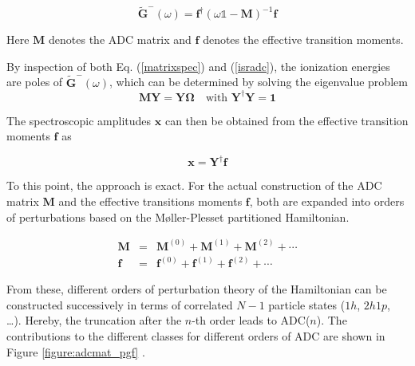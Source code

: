 \begin{equation}\label{isradc}
\mathbf{\tilde{G}}^-(\omega) = \mathbf{f}^\dagger(\omega\mathds{1}-\mathbf{M})^{-1}\mathbf{f}
\end{equation}

Here $\mathbf{M}$ denotes the {ADC} matrix and $\mathbf{f}$ denotes
the effective transition moments.

By inspection of both Eq. (\ref{matrixspec}) and (\ref{isradc}),
the ionization energies
are poles of $\mathbf{\tilde{G}}^-(\omega)$, which can be determined by
solving the eigenvalue problem
\begin{equation}\label{adcewp}
\mathbf{M} \mathbf{Y} = \mathbf{Y}\mathbf{\Omega} \quad\text{with } \mathbf{Y}^\dagger\mathbf{Y}=\mathbf{1}
\end{equation}

The spectroscopic amplitudes $\mathbf{x}$ can then be obtained from the
effective transition moments $\mathbf{f}$ as

\begin{equation}
 \mathbf{x} = \mathbf{Y}^\dagger \mathbf{f}
\end{equation}

To this point, the approach is exact.
For the actual construction of the {ADC} matrix $\mathbf{M}$ and the
effective transitions moments $\mathbf{f}$, both
are expanded into orders of perturbations based on the
M{\o}ller-Plesset partitioned Hamiltonian.

\begin{eqnarray}
\mathbf{M} &=& \mathbf{M}^{(0)} + \mathbf{M}^{(1)} + \mathbf{M}^{(2)} + \cdots\label{stf}\\
\mathbf{f} &=& \mathbf{f}^{(0)} + \mathbf{f}^{(1)} + \mathbf{f}^{(2)} + \cdots\label{stf}
\end{eqnarray}

From these, different orders of perturbation theory of the Hamiltonian can be
constructed successively in terms of correlated $N-1$ particle states ($1h$,
$2h1p$, \dots).
Hereby, the truncation after the $n$-th order leads
to ADC($n$). The contributions to the different classes for different
orders of {ADC} are shown
in Figure \ref{figure:adcmat_pgf} \cite{Trofimov05}.

